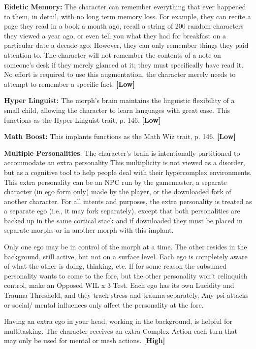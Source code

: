 \textbf{Eidetic Memory:} The character can remember everything
that ever happened to them, in detail, with
no long term memory loss. For example, they can 
recite a page they read in a book a month ago, recall 
a string of 200 random characters they viewed a year 
ago, or even tell you what they had for breakfast on 
a particular date a decade ago. However, they can 
only remember things they paid attention to. The 
character will not remember the contents of a note 
on someone's desk if they merely glanced at it; they 
must specifically have read it. No effort is required to 
use this augmentation, the character merely needs to 
attempt to remember a specific fact. \textbf{[Low]}

\textbf{Hyper Linguist: }The morph's brain maintains the 
linguistic flexibility of a small child, allowing the 
character to learn languages with great ease. This 
functions as the Hyper Linguist trait, p. 146. \textbf{[Low]}

\textbf{Math Boost:} This implants functions as the Math 
Wiz trait, p. 146. \textbf{[Low]}

\textbf{Multiple Personalities}: The character's brain is intentionally
partitioned to accommodate an extra personality
This multiplicity is not viewed as a disorder,
but as a cognitive tool to help people deal with their 
hypercomplex environments. This extra personality 
can be an NPC run by the gamemaster, a separate 
character (in ego form only) made by the player, or 
the downloaded fork of another character. For all intents
and purposes, the extra personality is treated as
a separate ego (i.e., it may fork separately), except that 
both personalities are backed up in the same cortical 
stack and if downloaded they must be placed in separate
morphs or in another morph with this implant.

Only one ego may be in control of the morph at a 
time. The other resides in the background, still active, 
but not on a surface level. Each ego is completely 
aware of what the other is doing, thinking, etc. If for 
some reason the subsumed personality wants to come 
to the fore, but the other personality won't relinquish 
control, make an Opposed WIL x 3 Test. Each ego has 
its own Lucidity and Trauma Threshold, and they track 
stress and trauma separately. Any psi attacks or social/
mental influences only affect the personality at the fore.

Having an extra ego in your head, working in the 
background, is helpful for multitasking. The character 
receives an extra Complex Action each turn that may 
only be used for mental or mesh actions. \textbf{[High]}

